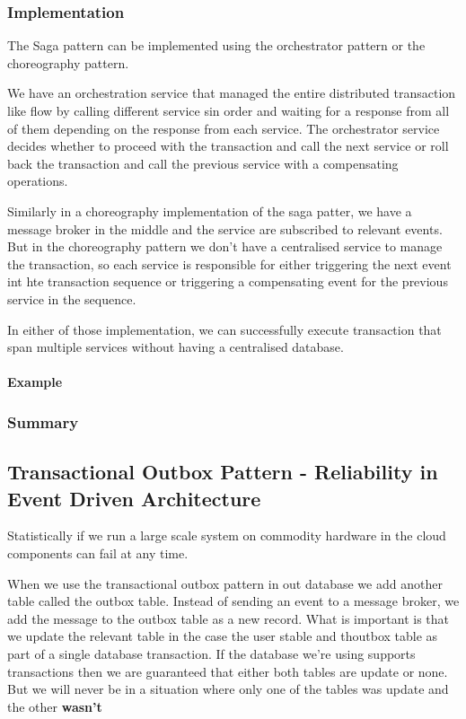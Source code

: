 \documentclass[a4paper, 11pt]{book}
\begin{document}
    \subsubsection{Implementation}
    The Saga pattern can be implemented using the orchestrator pattern or the choreography pattern.

    We have an orchestration service that managed the entire distributed transaction like flow by calling different service sin order and waiting for a response from all of them depending on the response from each service.
    The orchestrator service decides whether to proceed with the transaction and call the next service or roll back the transaction and call the previous service with a compensating operations.

    Similarly in a choreography implementation of the saga patter, we have a message broker in the middle and the service are subscribed to relevant events.
    But in the choreography pattern we don't have a centralised service to manage the transaction, so each service is responsible for either triggering the next event int hte transaction sequence or triggering a compensating event for the previous service in the sequence.

    In either of those implementation, we can successfully execute transaction that span multiple services without having a centralised database.

    \paragraph{Example}

    \subsubsection{Summary}

    \subsection{Transactional Outbox Pattern - Reliability in Event Driven Architecture}
    Statistically if we run a large scale system on commodity hardware in the cloud components can fail at any time.

    When we use the transactional outbox pattern in out database we add another table called the outbox table.
    Instead of sending an event to a message broker, we add the message to the outbox table as a new record.
    What is important is that we update the relevant table in the case the user stable and thoutbox table as part of a single database transaction.
    If the database we're using supports transactions then we are guaranteed that either both tables are update or none.
    But we will never be in a situation where only one of the tables was update and the other \textbf{wasn't}
\end{document}
